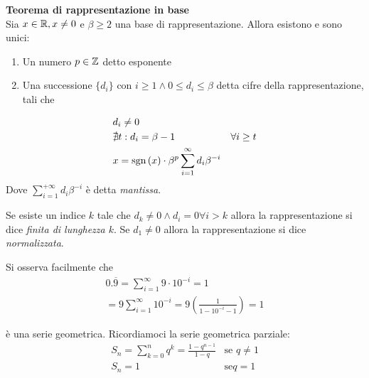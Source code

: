 \begin{defn}
    \textbf{Teorema di rappresentazione in base} \\
    Sia $x \in \mathbb{R}, x \neq 0$ e $\beta \geq 2$ una base di rappresentazione. Allora esistono e sono unici:
    \begin{enumerate}
        \item Un numero $p \in \mathbb{Z}$ detto esponente
        \item Una successione $\{d_i\}$ con $i \geq 1 \land 0 \leq d_i \leq \beta$ detta cifre della rappresentazione, tali che
    \end{enumerate}

    \begin{eqnarray*}
    & d_i \neq 0 & \\
    & \nexists t : d_i = \beta - 1 & \forall i \geq t \\
    & x = \text{sgn}\left(x\right) \cdot \beta^p \sum_{i=1}^{\infty} d_i \beta^{-i}
    \end{eqnarray*}
    Dove $\sum_{i=1}^{+\infty}d_i \beta^{-i}$ è detta \textit{mantissa}.

    Se esiste un indice $k$ tale che $d_k \neq 0 \land d_i = 0 \forall i > k$ allora la rappresentazione si dice \textit{finita di lunghezza $k$}.
    Se $d_1 \neq 0$ allora la rappresentazione si dice \textit{normalizzata}.  

    Si osserva facilmente che
    \begin{eqnarray*}
    0.\overbar{9} = \sum_{i=1}^{\infty} 9 \cdot 10^{-i} = 1 \\
    =  9\sum_{i=1}^{\infty} 10^{-i} = 9 \left(\frac{1}{1-10^{-i} - 1}\right) = 1
    \end{eqnarray*}

    è una serie geometrica. Ricordiamoci la serie geometrica parziale:
    \begin{eqnarray*}
        S_n = \sum_{k=0}^{n} q^k = \frac{1-q^{n-1}}{1-q} & \text{se } q \neq 1 \\
        S_n = 1 & \text{se} q = 1
    \end{eqnarray*}

\end{defn}

